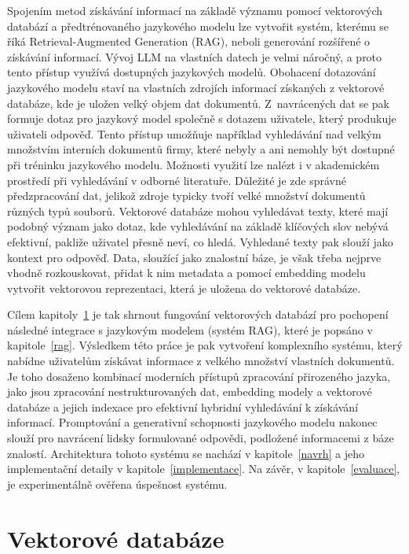 Spojením metod získávání informací na základě významu pomocí vektorových databází a předtrénovaného jazykového modelu lze vytvořit systém, kterému se říká Retrieval-Augmented Generation (RAG), neboli generování rozšířené o získávání informací. Vývoj LLM na vlastních datech je velmi náročný, a proto tento přístup využívá dostupných jazykových modelů. Obohacení dotazování jazykového modelu staví na vlastních zdrojích informací získaných z vektorové databáze, kde je uložen velký objem dat dokumentů. Z~navrácených dat se pak formuje dotaz pro jazykový model společně s dotazem uživatele, který produkuje uživateli odpověď. Tento přístup umožňuje například vyhledávání nad velkým množstvím interních dokumentů firmy, které nebyly a ani nemohly být dostupné při tréninku jazykového modelu. Možnosti využití lze nalézt i v akademickém prostředí při vyhledávání v odborné literatuře. Důležité je zde správné předzpracování dat, jelikož zdroje typicky tvoří velké množství dokumentů různých typů souborů. Vektorové databáze mohou vyhledávat texty, které mají podobný význam jako dotaz, kde vyhledávání na základě klíčových slov nebývá efektivní, pakliže uživatel přesně neví, co hledá. Vyhledané texty pak slouží jako kontext pro odpověď. Data, sloužící jako znalostní báze, je však třeba nejprve vhodně rozkouskovat, přidat k nim metadata a pomocí embedding modelu vytvořit vektorovou reprezentaci, která je uložena do vektorové databáze. 

Cílem kapitoly~\ref{vdb} je tak shrnout fungování vektorových databází pro pochopení následné integrace s jazykovým modelem (systém RAG), které je popsáno v kapitole~\ref{rag}. Výsledkem této práce je pak vytvoření komplexního systému, který nabídne uživatelům získávat informace z velkého množství vlastních dokumentů. Je toho dosaženo kombinací moderních přístupů zpracování přirozeného jazyka, jako jsou zpracování nestrukturovaných dat, embedding modely a vektorové databáze a jejich indexace pro efektivní hybridní vyhledávání k získávání informací. Promptování a generativní schopnosti jazykového modelu nakonec slouží pro navrácení lidsky formulované odpovědi, podložené informacemi z báze znalostí. Architektura tohoto systému se nachází v kapitole~\ref{navrh} a jeho implementační detaily v kapitole~\ref{implementace}. Na závěr, v kapitole~\ref{evaluace}, je experimentálně ověřena úspešnost systému.

\chapter{Vektorové databáze}
\label{vdb}

